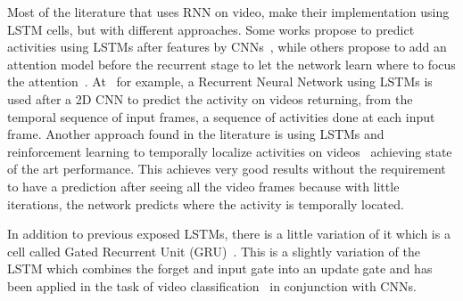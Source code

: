 Most of the literature that uses RNN on video, make their implementation using LSTM cells, but with different approaches. Some works propose to predict activities using LSTMs after features by CNNs~\cite{yao2015describing}, while others propose to add an attention model before the recurrent stage to let the network learn where to focus the attention~\cite{sharma2015action,piergiovanni2016temporal}. At~\cite{yeung2015every} for example, a Recurrent Neural Network using LSTMs is used after a 2D CNN to predict the activity on videos returning, from the temporal sequence of input frames, a sequence of activities done at each input frame.
Another approach found in the literature is using LSTMs and reinforcement learning to temporally localize activities on videos~\cite{yeung2015end} achieving state of the art performance. This achieves very good results without the requirement to have a prediction after seeing all the video frames because with little iterations, the network predicts where the activity is temporally located.

In addition to previous exposed LSTMs, there is a little variation of it which is a cell called Gated Recurrent Unit (GRU)~\cite{cho2014learning}. This is a slightly variation of the LSTM which combines the forget and input gate into an update gate and has been applied in the task of video classification~\cite{ballas2015delving} in conjunction with CNNs.
